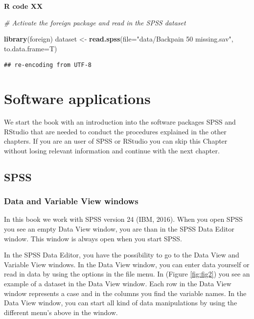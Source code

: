 \documentclass[]{book}
\newenvironment{Shaded}{\begin{snugshade}}{\end{snugshade}}
\newcommand{\KeywordTok}[1]{\textcolor[rgb]{0.13,0.29,0.53}{\textbf{#1}}}
\newcommand{\DataTypeTok}[1]{\textcolor[rgb]{0.13,0.29,0.53}{#1}}
\newcommand{\StringTok}[1]{\textcolor[rgb]{0.31,0.60,0.02}{#1}}
\newcommand{\CommentTok}[1]{\textcolor[rgb]{0.56,0.35,0.01}{\textit{#1}}}
\newcommand{\NormalTok}[1]{#1}
\theoremstyle{definition}
\theoremstyle{definition}
\theoremstyle{definition}
\theoremstyle{remark}
\begin{document}
\textbf{R code XX}

\begin{Shaded}
\begin{Highlighting}[]
\CommentTok{# Activate the foreign package and read in the SPSS dataset}

\KeywordTok{library}\NormalTok{(foreign)}
\NormalTok{dataset <-}\StringTok{ }\KeywordTok{read.spss}\NormalTok{(}\DataTypeTok{file=}\StringTok{"data/Backpain 50 missing.sav"}\NormalTok{, }\DataTypeTok{to.data.frame=}\NormalTok{T)}
\end{Highlighting}
\end{Shaded}

\begin{verbatim}
## re-encoding from UTF-8
\end{verbatim}

\chapter{Software applications}\label{software-applications}

We start the book with an introduction into the software packages SPSS
and RStudio that are needed to conduct the procedures explained in the
other chapters. If you are an user of SPSS or RStudio you can skip this
Chapter without losing relevant information and continue with the next
chapter.

\section{SPSS}\label{spss}

\subsection{Data and Variable View
windows}\label{data-and-variable-view-windows}

In this book we work with SPSS version 24 (IBM, 2016). When you open
SPSS you see an empty Data View window, you are than in the SPSS Data
Editor window. This window is always open when you start SPSS.

In the SPSS Data Editor, you have the possibility to go to the Data View
and Variable View windows. In the Data View window, you can enter data
yourself or read in data by using the options in the file menu. In
(Figure \ref{fig:fig2}) you see an example of a dataset in the Data View
window. Each row in the Data View window represents a case and in the
columns you find the variable names. In the Data View window, you can
start all kind of data manipulations by using the different menu's above
in the window.
\end{document}
